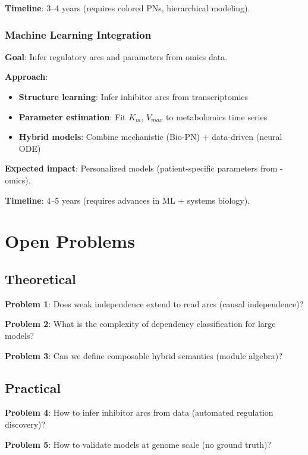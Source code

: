 \textbf{Timeline}: 3--4 years (requires colored PNs, hierarchical modeling).

\subsubsection{Machine Learning Integration}

\textbf{Goal}: Infer regulatory arcs and parameters from omics data.

\textbf{Approach}:
\begin{itemize}
    \item \textbf{Structure learning}: Infer inhibitor arcs from transcriptomics
    \item \textbf{Parameter estimation}: Fit $K_m$, $V_{max}$ to metabolomics time series
    \item \textbf{Hybrid models}: Combine mechanistic (Bio-PN) + data-driven (neural ODE)
\end{itemize}

\textbf{Expected impact}: Personalized models (patient-specific parameters from -omics).

\textbf{Timeline}: 4--5 years (requires advances in ML + systems biology).

\section{Open Problems}
\label{sec:open-problems}

\subsection{Theoretical}
\label{subsec:theory-problems}

\textbf{Problem 1}: Does weak independence extend to read arcs (causal independence)?

\textbf{Problem 2}: What is the complexity of dependency classification for large models?

\textbf{Problem 3}: Can we define composable hybrid semantics (module algebra)?

\subsection{Practical}
\label{subsec:practical-problems}

\textbf{Problem 4}: How to infer inhibitor arcs from data (automated regulation discovery)?

\textbf{Problem 5}: How to validate models at genome scale (no ground truth)?

